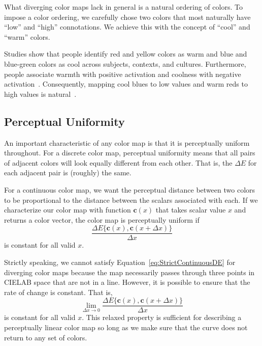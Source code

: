 \documentclass{llncs}
\newcommand{\lcite}[1]{~\cite{#1}}
\newcommand{\Lab}{CIELAB\xspace}
\newcommand{\DeltaE}{\ensuremath{\Delta{}E}\xspace}
\newcommand*{\cvec}[1]{\mathbf{#1}}
\begin{document}
What diverging color maps lack in general is a natural ordering of colors.
To impose a color ordering, we carefully chose two colors that most
naturally have ``low'' and ``high'' connotations.  We achieve this with the
concept of ``cool'' and ``warm'' colors.

Studies show that people identify red and yellow colors as warm and blue and
blue-green colors as cool across subjects, contexts, and
cultures.  Furthermore, people associate warmth with positive activation
and coolness with negative activation\lcite{Hardin97}.  Consequently,
mapping cool blues to low values and warm reds to high values is
natural\lcite{Fortner97}.


\subsection{Perceptual Uniformity}
\label{sec:PerceptualUniformity}

An important characteristic of any color map is that it is perceptually
uniform throughout.  For a discrete color map, perceptual uniformity means
that all pairs of adjacent colors will look equally different from each
other.  That is, the \DeltaE for each adjacent pair is (roughly) the same.

For a continuous color map, we want the perceptual distance between two
colors to be proportional to the distance between the scalars associated
with each.    If we characterize our color map with function $\cvec{c}(x)$
that takes scalar value $x$ and returns a color vector, the color map is
perceptually uniform if
\begin{equation}
  \frac{\DeltaE\{\cvec{c}(x),\cvec{c}(x+\Delta{x})\}}{\Delta{}x}
  \label{eq:StrictContinuousDE}
\end{equation}
is constant for all valid $x$.

Strictly speaking, we cannot satisfy Equation~\ref{eq:StrictContinuousDE}
for diverging color maps because the map necessarily passes through three
points in \Lab space that are not in a line.  However, it is possible to
ensure that the rate of change is constant.  That is,
\begin{equation}
  \lim_{\Delta{}x \rightarrow 0}{
    \frac{\DeltaE\{\cvec{c}(x),\cvec{c}(x+\Delta{x})\}}{\Delta{}x} }
  \label{eq:ContinuousDE}
\end{equation}
is constant for all valid $x$.  This relaxed property is sufficient for
describing a perceptually linear color map so long as we make sure that the
curve does not return to any set of colors.
\end{document}
